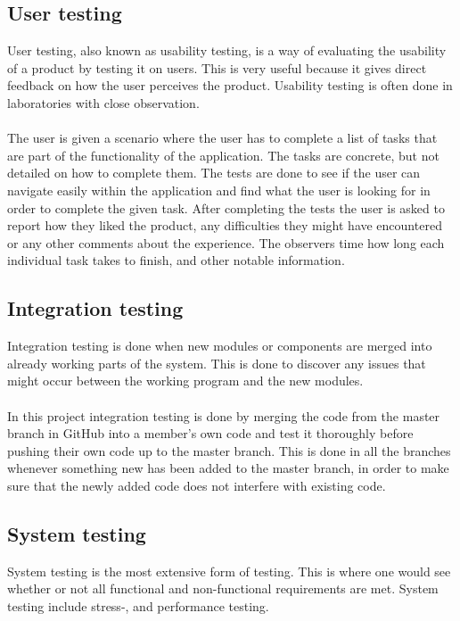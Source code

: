 \subsection{User testing}
User testing, also known as usability testing, is a way of evaluating the usability of a product by testing it on users. This is very useful because it gives direct feedback on how the user perceives the product. Usability testing is often done in laboratories with close observation.\cite{UseTest}\cite{UseTest2}
\\\\
The user is given a scenario where the user has to complete a list of tasks that are part of the functionality of the application. The tasks are concrete, but not detailed on how to complete them. The tests are done to see if the user can navigate easily within the application and find what the user is looking for in order to complete the given task. After completing the tests the user is asked to report how they liked the product, any difficulties they might have encountered or any other comments about the experience. The observers time how long each individual task takes to finish, and other notable information.\cite{UseTest}

\subsection{Integration testing}
Integration testing is done when new modules or components are merged into already working parts of the system. This is done to discover any issues that might occur between the working program and the new modules. \cite{IntegrationTest}
\\\\
In this project integration testing is done by merging the code from the master branch in GitHub into a member's own code and test it thoroughly before pushing their own code up to the master branch. This is done in all the branches whenever something new has been added to the master branch, in order to make sure that the newly added code does not interfere with existing code.

\subsection{System testing}
System testing is the most extensive form of testing. This is where one would see whether or not all functional and non-functional requirements are met. \cite{SystemTest2}System testing include stress-, and  performance testing.\cite{SystemTest} 


